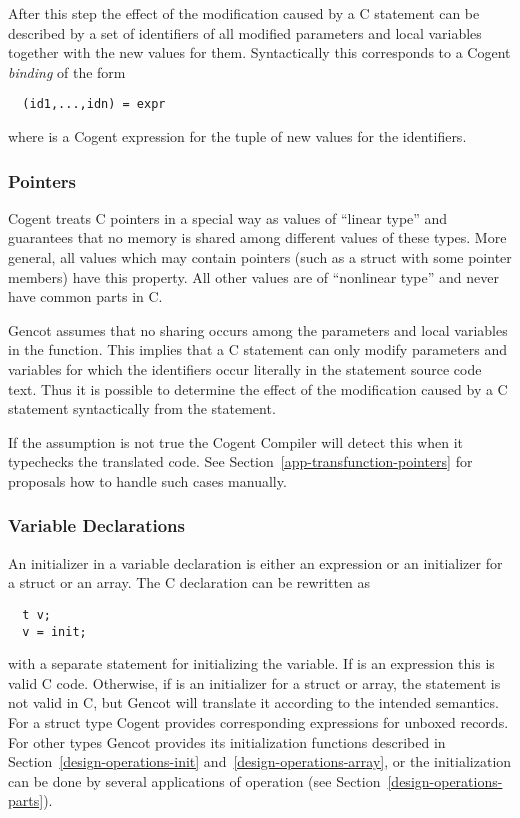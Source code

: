 After this step the effect of the modification caused by a C statement can be described by a set of identifiers 
of all modified parameters and local variables together with the new values for them. Syntactically this corresponds
to a Cogent \textit{binding} of the form
\begin{verbatim}
  (id1,...,idn) = expr
\end{verbatim}
where  is a Cogent expression for the tuple of new values for the identifiers.

\subsubsection{Pointers}

Cogent treats C pointers in a special way as values of ``linear type'' and guarantees that no memory is shared
among different values of these types. More general, all values which may contain pointers (such as a struct with
some pointer members) have this property. All other values are of ``nonlinear type'' and never have common parts 
in C.

Gencot assumes that no sharing occurs among the parameters and local variables in the function. This implies that 
a C statement can only modify parameters and variables for which the identifiers occur literally in the statement
source code text. Thus it is possible to determine the effect of the modification caused by a C statement
syntactically from the statement.

If the assumption is not true the Cogent Compiler will detect this when it typechecks the translated code. See
Section~\ref{app-transfunction-pointers} for proposals how to handle such cases manually.

\subsubsection{Variable Declarations}

An initializer  in a variable declaration  is either an expression or an initializer for
a struct or an array. The C declaration can be rewritten as
\begin{verbatim}
  t v;
  v = init;
\end{verbatim}
with a separate statement for initializing the variable. If  is an expression this is valid C code. Otherwise,
if  is an initializer for a struct or array, the statement is not valid in C, but Gencot will translate it 
according to the intended semantics. For a struct type Cogent provides
corresponding expressions for unboxed records. For other types Gencot provides its initialization functions 
described in Section~\ref{design-operations-init} and~\ref{design-operations-array},
or the initialization can be done by several applications of operation  (see Section~\ref{design-operations-parts}).

